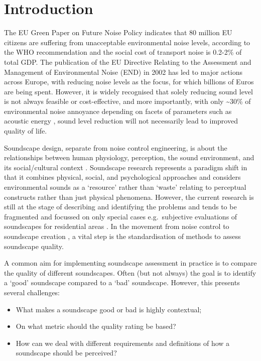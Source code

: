 \documentclass[
  authoryear,
  preprint,
  3p]{elsarticle}
\providecommand{\tightlist}{%
  \setlength{\itemsep}{0pt}\setlength{\parskip}{0pt}}\usepackage{longtable,booktabs,array}
\begin{document}
\section{Introduction}\label{introduction}

The EU Green Paper on Future Noise Policy indicates that 80 million EU
citizens are suffering from unacceptable environmental noise levels,
according to the WHO recommendation \citep{Berglund1999Guidelines} and
the social cost of transport noise is 0.2-2\% of total GDP. The
publication of the EU Directive Relating to the Assessment and
Management of Environmental Noise (END)
\citep{EuropeanUnion2002Directive} in 2002 has led to major actions
across Europe, with reducing noise levels as the focus, for which
billions of Euros are being spent. However, it is widely recognised that
solely reducing sound level is not always feasible or cost-effective,
and more importantly, with only \textasciitilde30\% of environmental
noise annoyance depending on facets of parameters such as acoustic
energy \citep{Guski1997Psychological}, sound level reduction will not
necessarily lead to improved quality of life.

Soundscape design, separate from noise control engineering, is about the
relationships between human physiology, perception, the sound
environment, and its social/cultural context \citep{Kang2006Urban}.
Soundscape research represents a paradigm shift in that it combines
physical, social, and psychological approaches and considers
environmental sounds as a `resource' rather than `waste'
\citep{Kang2016Soundscape} relating to perceptual constructs rather than
just physical phenomena. However, the current research is still at the
stage of describing and identifying the problems and tends to be
fragmented and focussed on only special cases e.g.~subjective
evaluations of soundscapes for residential areas
\citep{SchulteFortkamp2013Introduction}. In the movement from noise
control to soundscape creation \citep{Aletta2015Soundscape}, a vital
step is the standardisation of methods to assess soundscape quality.

A common aim for implementing soundscape assessment in practice is to
compare the quality of different soundscapes. Often (but not always) the
goal is to identify a `good' soundscape compared to a `bad' soundscape.
However, this presents several challenges:

\begin{itemize}
\tightlist
\item
  What makes a soundscape good or bad is highly contextual;
\item
  On what metric should the quality rating be based?
\item
  How can we deal with different requirements and definitions of how a
  soundscape should be perceived?
\end{itemize}
\end{document}
